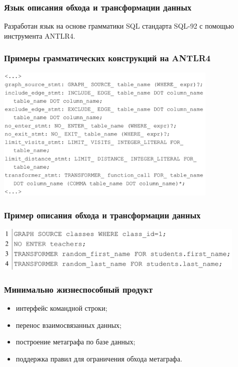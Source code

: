 \documentclass[pdf, hyperref={unicode}, aspectratio=169]{beamer}
\begin{document}
\begin{frame}
\frametitle{Язык описания обхода и трансформации данных}
	Разработан язык на основе грамматики SQL стандарта SQL-92 с помощью инструмента ANTLR4.
\end{frame}


\begin{frame}
\frametitle{Примеры грамматических конструкций на ANTLR4}
	\begin{center}
		\includegraphics[height = 6.5cm]{img/grammar}
	\end{center}
\end{frame}


\begin{frame}
\frametitle{Пример описания обхода и трансформации данных}
	\begin{center}
		\includegraphics[width = 12cm]{img/language-1}
	\end{center}
\end{frame}


\begin{frame}
\frametitle{Минимально жизнеспособный продукт}
	\begin{itemize}
		\item интерфейс командной строки;
		\item перенос взаимосвязанных данных;
		\item построение метаграфа по базе данных;
		\item поддержка правил для ограничения обхода метаграфа.
	\end{itemize}
\end{frame}
\end{document}
